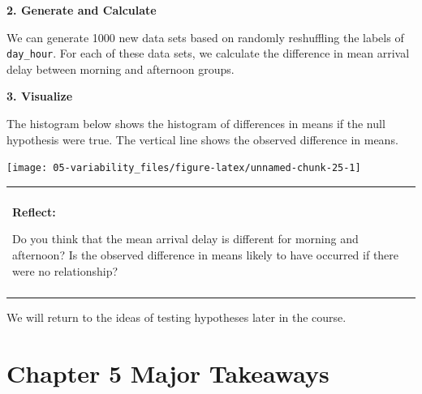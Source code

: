 \documentclass[
]{book}
\newenvironment{reflect}
{
    \begin{center}
    
    \begin{tabular}{|p{0.8\textwidth}|}
    \rowcolor{LightBlue}
    \hline\\
    \rowcolor{LightBlue}
    \textbf{Reflect:}
}
{
    \\\rowcolor{LightBlue}
    \\\hline
    \end{tabular} 
    \end{center}
}
\begin{document}
\textbf{2. Generate and Calculate}

We can generate 1000 new data sets based on randomly reshuffling the labels of \texttt{day\_hour}. For each of these data sets, we calculate the difference in mean arrival delay between morning and afternoon groups.

\textbf{3. Visualize}

The histogram below shows the histogram of differences in means if the null hypothesis were true. The vertical line shows the observed difference in means.

\begin{center}\texttt{[image: 05-variability\_files/figure-latex/unnamed-chunk-25-1]} \end{center}

\begin{reflect}
Do you think that the mean arrival delay is different for morning and
afternoon? Is the observed difference in means likely to have occurred
if there were no relationship?
\end{reflect}

We will return to the ideas of testing hypotheses later in the course.

\hypertarget{chapter-5-major-takeaways}{%
\section{Chapter 5 Major Takeaways}\label{chapter-5-major-takeaways}}
\end{document}
